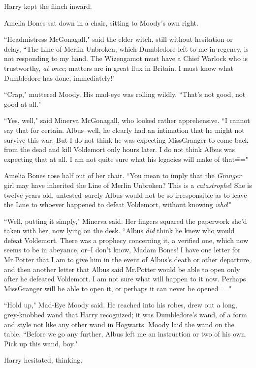 Harry kept the flinch inward.

Amelia Bones sat down in a chair, sitting to Moody's own right.

``Headmistress McGonagall," said the elder witch, still without hesitation or delay, ``The Line of Merlin Unbroken, which Dumbledore left to me in regency, is not responding to my hand. The Wizengamot must have a Chief Warlock who is trustworthy, \emph{at once}; matters are in great flux in Britain. I must know what Dumbledore has done, immediately!"

``Crap," muttered Moody. His mad-eye was rolling wildly. ``That's not good, not good at all."

``Yes, well," said Minerva McGonagall, who looked rather apprehensive. ``I cannot say that for certain. Albus\---well, he clearly had an intimation that he might not survive this war. But I do not think he was expecting Miss\?Granger to come back from the dead and kill Voldemort only hours later. I do not think Albus was expecting that at all. I am not quite sure what his legacies will make of that\==="

Amelia Bones rose half out of her chair. ``You mean to imply that the \emph{Granger} girl may have inherited the Line of Merlin Unbroken? This is a \emph{catastrophe}! She is twelve years old, untested\---surely Albus would not be so irresponsible as to leave the Line to whoever happened to defeat Voldemort, without knowing \emph{who}!"

``Well, putting it simply," Minerva said. Her fingers squared the paperwork she'd taken with her, now lying on the desk. ``Albus \emph{did} think he knew who would defeat Voldemort. There was a prophecy concerning it, a verified one, which now seems to be in abeyance, or\---I don't know, Madam Bones! I have one letter for Mr.\?Potter that I am to give him in the event of Albus's death or other departure, and then another letter that Albus said Mr.\?Potter would be able to open only after he defeated Voldemort. I am not sure what will happen to it now. Perhaps Miss\?Granger will be able to open it, or perhaps it can never be opened\==="

``Hold up," Mad-Eye Moody said. He reached into his robes, drew out a long, grey-knobbed wand that Harry recognized; it was Dumbledore's wand, of a form and style not like any other wand in Hogwarts. Moody laid the wand on the table. ``Before we go any further, Albus left me an instruction or two of his own. Pick up this wand, boy."

Harry hesitated, thinking.

